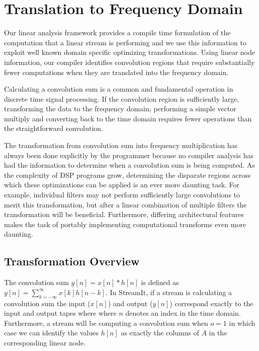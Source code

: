 
\section{Translation to Frequency Domain}
\label{sec:freq}

Our linear analysis framework provides a compile time formulation of
the computation that a linear stream is performing and we use this
information to exploit well known domain specific optimizing
transformations.  Using linear node information, our compiler
identifies convolution regions that require substantially fewer
computations when they are translated into the frequency domain.

Calculating a convolution sum is a common and fundamental operation in
discrete time signal processing.  If the convolution region is
sufficiently large, transforming the data to the frequency domain,
performing a simple vector multiply and converting back to the time
domain requires fewer operations than the straightforward convolution.

The transformation from convolution sum into frequency multiplication
has always been done explicitly by the programmer because no compiler
analysis has had the information to determine when a convolution sum
is being computed.  As the complexity of DSP programs grow,
determining the disparate regions across which these optimizations can
be applied is an ever more daunting task. For example, individual
filters may not perform sufficiently large convolutions to merit this
transformation, but after a linear combination of multiple filters the
transformation will be beneficial.  Furthermore, differing
architectural features makes the task of portably implementing 
computational transforms even more daunting.

\subsection{Transformation Overview}
The convolution sum $y[n]=x[n]*h[n]$ is defined as
$y[n]=\sum_{k=-\infty}^{\infty}x[k]h[n-k]$. In StreamIt, if a 
stream is calculating a convolution sum the input
($x[n]$) and output ($y[n]$) correspond exactly to the input and
output tapes where where $n$ denotes an index in the time domain.  
Furthermore, a stream will be computing a
convolution sum when $o=1$ in which case we can identify the values
$h[n]$ as exactly the columns of $A$ in the corresponding linear node.

